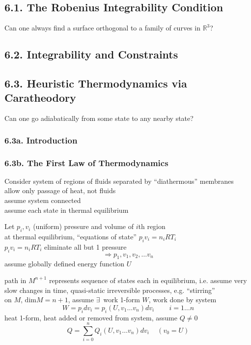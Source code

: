 
\subsection{6.1. The Robenius Integrability Condition}

Can one always find a surface orthogonal to a family of curves in $\mathbb{R}^3$?

\subsection{6.2. Integrability and Constraints}

\subsection{6.3. Heuristic Thermodynamics via Caratheodory}

Can one go adiabatically from some state to any nearby state?

\subsubsection{6.3a. Introduction}



\subsubsection{6.3b. The First Law of Thermodynamics}

Consider system of regions of fluids separated by ``diathermous'' membranes \\
\phantom{\quad \, } allow only passage of heat, not fluids \\

assume system connected \\
assume each state in thermal equilibrium

Let $p_i,v_i$ (uniform) pressure and volume of $i$th region \\
\phantom{\quad \, } at thermal equilibrium, ``equations of state'' $p_iv_i = n_iRT_i$ \\
\phantom{\quad \quad \, } $p_i v_i = n_iRT_i$ eliminate all but 1 pressure
\[
\Longrightarrow p_1, v_1,v_2, \dots v_n
\]
assume globally defined energy function $U$

path in $M^{n+1}$ represents sequence of states each in equilibrium, i.e. assume very slow changes in time, quasi-static irreversible processes, e.g. ``stirring'' \\
on $M$, $\text{dim}{M} = n+1$, assume $\exists \, $ work 1-form $W$, work done by system 
\[
W = p_i dv_i = p_i(U,v_1\dots v_n)dv_i \quad \quad \, i=1 \dots n 
\]
heat 1-form, heat added or removed from system, assume $Q \neq 0$
\[
Q = \sum_{i=0}^n Q_i(U,v_1 \dots v_n) dv_i \quad \, (v_0 = U)
\]

